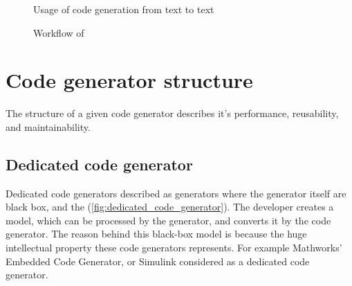 \begin{figure}
	\centering
	\caption{Usage of code generation from text to text}
	\label{fig:model_transformations}
\end{figure}

\begin{figure}
	\centering
	\caption{Workflow of}
	\label{fig:model_transformation_cpp}
\end{figure}

\section{Code generator structure}

The structure of a given code generator describes it's performance, reusability, and maintainability.

\subsection{Dedicated code generator}
\label{subsec:dedicated_code_generator}

Dedicated code generators described as generators where the generator itself are black box, and the (\cref{fig:dedicated_code_generator}). The developer creates a model, which can be processed by the generator, and converts it by the code generator. The reason behind this black-box model is because the huge intellectual property these code generators represents. For example Mathworks' Embedded Code Generator, or Simulink \citep{MATHWORKS_ECG}\citep{MATHWORKS_SIMULINK} considered as a dedicated code generator.

